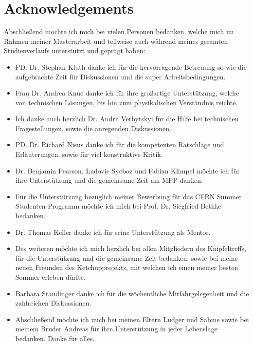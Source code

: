 \chapter*{Acknowledgements}
\label{sec:ack}

Abschließend möchte ich mich bei vielen Personen bedanken, welche mich im Rahmen meiner Masterarbeit und  teilweise auch während meines gesamten Studienverlaufs unterstützt und geprägt haben:
\begin{itemize}
	\item PD. Dr. Stephan Kluth  danke ich für die hervorragende Betreuung so wie die aufgebrachte Zeit für Diskussionen und die super Arbeitsbedingungen.

	\item Frau Dr. Andrea Knue  danke ich für ihre großartige Unterstützung, welche von technischen Lösungen, bis hin zum physikalischen Verständnis reichte.
	
   \item Ich danke auch herzlich Dr. Andrii Verbytskyi für die  Hilfe bei technischen Fragestellungen, sowie die anregenden Diskussionen. 
     
   \item PD. Dr. Richard Nisus danke ich für die kompetenten Ratschläge und Erläuterungen, sowie für viel konstruktive  Kritik.  
   
   \item Dr. Benjamin Pearson, Ludovic Sycboz und Fabian Klimpel möchte ich für  ihre  Unterstützung und die gemeinsame Zeit am MPP danken. 
   
   \item Für die Unterstützung bezüglich meiner Bewerbung für das CERN Summer Studenten Programm möchte ich mich bei  Prof. Dr. Siegfried Bethke  bedanken.
   
   \item Dr. Thomas Keller danke ich für seine Unterstützung als Mentor. 
   
   \item Des weiteren möchte ich mich herzlich bei allen Mitgliedern des Knipfeltreffs, für die Unterstützung und die gemeinsame Zeit bedanken, sowie bei meine neuen Freunden des  Ketchupprojekts, mit welchen ich einen meiner besten Sommer erleben dürfte. 
   
   \item Barbara Staudinger danke ich für die wöchentliche Mitfahrgelegenheit und die zahlreichen Diskussionen.
   
   \item Abschließend möchte ich mich bei meinen Eltern Ludger und Sabine sowie bei  meinem Bruder Andreas für ihre Unterstützung in jeder Lebenslage bedanken. Danke für alles.
\end{itemize}
